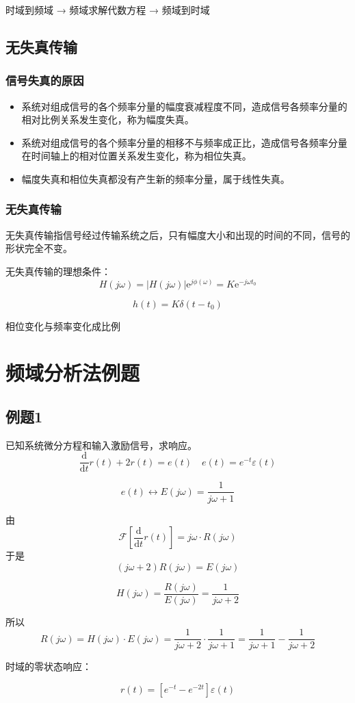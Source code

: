 \documentclass[UTF8]{ctexart}
\begin{document}
时域到频域 → 频域求解代数方程 → 频域到时域

\subsection{无失真传输}

\subsubsection{信号失真的原因}

\begin{itemize}
    \item 系统对组成信号的各个频率分量的幅度衰减程度不同，造成信号各频率分量的相对比例关系发生变化，称为幅度失真。
    \item 系统对组成信号的各个频率分量的相移不与频率成正比，造成信号各频率分量在时间轴上的相对位置关系发生变化，称为相位失真。
    \item 幅度失真和相位失真都没有产生新的频率分量，属于线性失真。
\end{itemize}

\subsubsection{无失真传输}

无失真传输指信号经过传输系统之后，只有幅度大小和出现的时间的不同，信号的形状完全不变。

无失真传输的理想条件：
$$
H(j\omega)=|H(j\omega)|\mathrm{e}^{j\phi(\omega)}=K\mathrm{e}^{-j\omega t_0}
$$

$$
h(t)=K\delta(t-t_0)
$$

相位变化与频率变化成比例

\section{频域分析法例题}

\subsection{例题1}

\begin{problem}
已知系统微分方程和输入激励信号，求响应。
$$
\frac{\mathrm{d}}{\mathrm{d}t}r(t)+2r(t)=e(t) \quad e(t)=e^{-t}\varepsilon(t)
$$
\end{problem}

\begin{solution}
$$
e(t) \leftrightarrow E(j\omega)=\frac{1}{j\omega+1}
$$

由
$$
\mathscr{F}\left[\frac{\mathrm{d}}{\mathrm{d}t}r(t)\right]=j\omega\cdot R(j\omega)
$$
于是
$$
(j\omega+2)R(j\omega)=E(j\omega)
$$

$$
H(j\omega)=\frac{R(j\omega)}{E(j\omega)}=\frac{1}{j\omega+2}
$$

所以
$$
R(j\omega)=H(j\omega)\cdot E(j\omega)=\frac{1}{j\omega+2} \cdot \frac{1}{j\omega+1} = \frac{1}{j\omega+1} - \frac{1}{j\omega+2}
$$

时域的零状态响应：

$$
r(t)=\left[e^{-t}-e^{-2t}\right]\varepsilon(t)
$$
\end{solution}
\end{document}
